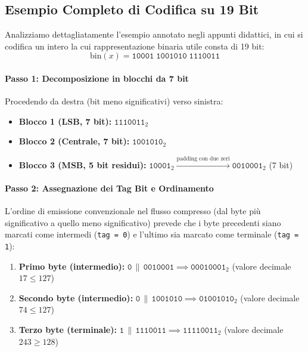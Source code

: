 \FloatBarrier
\subsection{Esempio Completo di Codifica su 19 Bit}
\label{subsec:esempio-vbyte-completo}

Analizziamo dettagliatamente l'esempio annotato negli appunti didattici, in cui si codifica un intero la cui rappresentazione binaria utile consta di 19 bit:
\begin{equation}
  \text{bin}(x) = \texttt{10001} \; \texttt{1001010} \; \texttt{1110011}
\end{equation}

\paragraph{Passo 1: Decomposizione in blocchi da 7 bit}
Procedendo da destra (bit meno significativi) verso sinistra:
\begin{itemize}
  \item \textbf{Blocco 1 (LSB, 7 bit):} $\texttt{1110011}_2$
  \item \textbf{Blocco 2 (Centrale, 7 bit):} $\texttt{1001010}_2$
  \item \textbf{Blocco 3 (MSB, 5 bit residui):} $\texttt{10001}_2 \xrightarrow{\text{padding con due zeri}} \texttt{0010001}_2$ (7 bit)
\end{itemize}

\paragraph{Passo 2: Assegnazione dei Tag Bit e Ordinamento}
L'ordine di emissione convenzionale nel flusso compresso (dal byte pi\`u significativo a quello meno significativo) prevede che i byte precedenti siano marcati come intermedi (\texttt{tag = 0}) e l'ultimo sia marcato come terminale (\texttt{tag = 1}):
\begin{enumerate}
  \item \textbf{Primo byte (intermedio):} $\texttt{0} \,\|\, \texttt{0010001} \implies \texttt{00010001}_2$ (valore decimale $17 \le 127$)
  \item \textbf{Secondo byte (intermedio):} $\texttt{0} \,\|\, \texttt{1001010} \implies \texttt{01001010}_2$ (valore decimale $74 \le 127$)
  \item \textbf{Terzo byte (terminale):} $\texttt{1} \,\|\, \texttt{1110011} \implies \texttt{11110011}_2$ (valore decimale $243 \ge 128$)
\end{enumerate}

